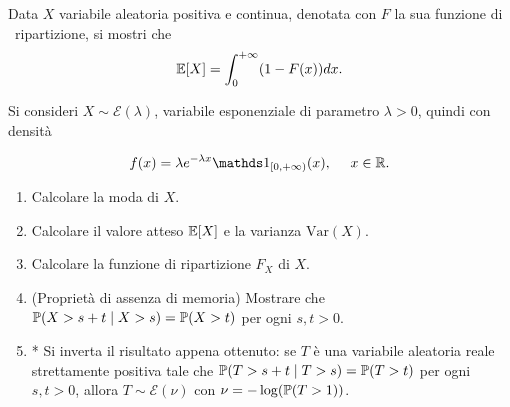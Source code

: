 Data $X$ variabile aleatoria positiva e continua, denotata con $F$ la sua funzione di \ ripartizione, si mostri che
\begin{equation*}
\mathbb{E}[X] =\int_{0}^{+\infty }(1-F(x)) dx.
\end{equation*}

Si consideri $X\sim \mathcal{E}(\lambda)$, variabile esponenziale di parametro $\lambda  >0$, quindi con densità


\begin{equation*}
f(x) =\lambda e^{-\lambda x} \Ind_{[ 0,+\infty)}(x) ,\ \ \ \ x\in \mathbb{R} .
\end{equation*}
\begin{enumerate}
\item Calcolare la moda di $X$.
\item Calcolare il valore atteso $\mathbb{E}[X]$ e la varianza $\mathrm{Var}(X)$.
\item Calcolare la funzione di ripartizione $F_{X}$ di $X$.
\item (Proprietà di assenza di memoria) Mostrare che $\mathbb{P}(X >s+t \mid X >s) =\mathbb{P}(X >t)$ per ogni $s,t >0$.
\item * Si inverta il risultato appena ottenuto: se $T$ è una variabile aleatoria reale strettamente positiva tale che $\mathbb{P}(T >s+t\mid T >s) =\mathbb{P}(T >t)$ per ogni $s,t >0$, allora $T\sim \mathcal{E}(\nu)$ con $\nu =-\log(\mathbb{P}(T >1))$.
\end{enumerate}

